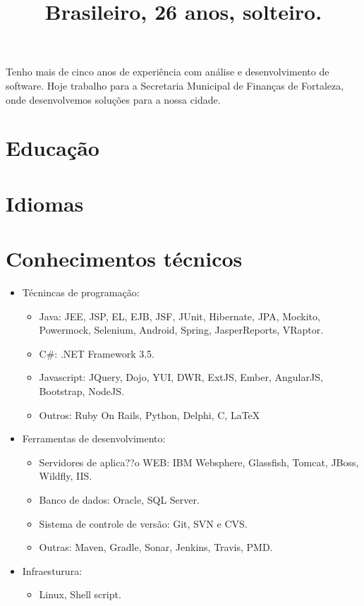 \documentclass[12pt,a4paper]{moderncv}
\title{\small Brasileiro, 26 anos, solteiro.}
\begin{document}
\makecvtitle

Tenho mais de cinco anos de experiência com análise e desenvolvimento de software. Hoje trabalho para a Secretaria Municipal de Finanças de Fortaleza, onde desenvolvemos soluções para a nossa cidade.

\section{Educação}

\section{Idiomas}

\section{Conhecimentos técnicos}
\begin{itemize}
\item Técnincas de programação:
  \begin{itemize}
  \item Java: JEE, JSP, EL, EJB, JSF, JUnit, Hibernate, JPA, Mockito, Powermock, Selenium, Android, Spring, JasperReports, VRaptor.
  \item C\#: .NET Framework 3.5.
  \item Javascript: JQuery, Dojo, YUI, DWR, ExtJS, Ember, AngularJS, Bootstrap, NodeJS.
  \item Outros: Ruby On Rails, Python, Delphi, C, \LaTeX\
  \end{itemize}
\item Ferramentas de desenvolvimento:
   \begin{itemize}
      \item Servidores de aplica??o WEB: IBM Websphere, Glassfish, Tomcat, JBoss, Wildfly, IIS.
      \item Banco de dados: Oracle, SQL Server.
      \item Sistema de controle de versão: Git, SVN e CVS.
      \item Outras: Maven, Gradle, Sonar, Jenkins, Travis, PMD.
   \end{itemize}
\item Infraesturura:
   \begin{itemize}
         \item Linux, Shell script.
   \end{itemize}
\end{itemize}
\end{document}
